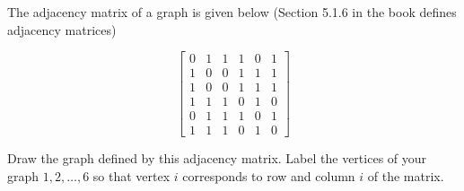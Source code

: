 \documentclass[12pt,twoside]{article}
\begin{document}
\begin{problem}{15}
The adjacency matrix of a graph is given below (Section 5.1.6  in the book defines adjacency matrices)

\[
\left[
\begin{array}{cccccc}
0 & 1 & 1 & 1 & 0 & 1 \\
1 & 0 & 0 & 1 & 1 & 1 \\
1 & 0 & 0 & 1 & 1 & 1 \\
1 & 1 & 1 & 0 & 1 & 0 \\
0 & 1 & 1 & 1 & 0 & 1 \\
1 & 1 & 1 & 0 & 1 & 0
\end{array}
\right]
\]

\begin{problemparts}

 Draw the graph defined by this adjacency matrix.  Label
the vertices of your graph $1, 2, \ldots, 6$ so that vertex $i$
corresponds to row and column $i$ of the matrix.


\end{problemparts}
\end{problem}
\end{document}
